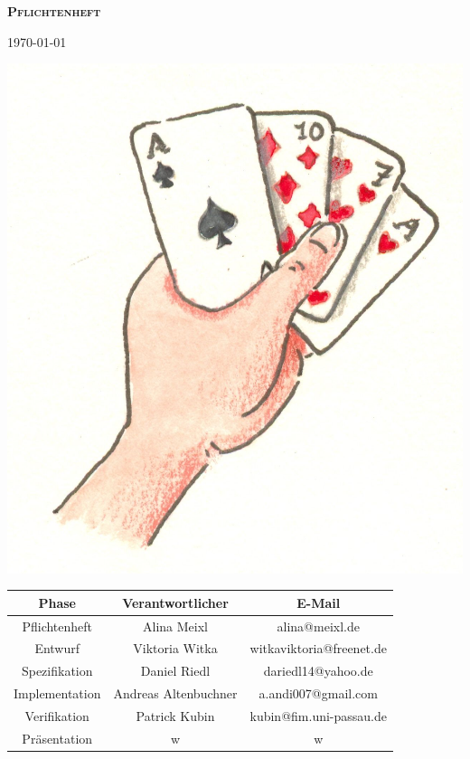 \documentclass{article}
\begin{document}
\begin{titlepage}

\begin{center}
\textbf{\textsc{\LARGE Pflichtenheft}}

{\large \today}

\vspace{2cm}
\includegraphics{kartenspiel}

\vspace{2cm}

\begin{tabular}{|c|c|c|}\hline
   Phase & Verantwortlicher & E-Mail \\ \hline\hline
   Pflichtenheft & Alina  Meixl  &  alina@meixl.de \\ \hline
   Entwurf & Viktoria Witka & witkaviktoria@freenet.de \\ \hline
   Spezifikation & Daniel Riedl & dariedl14@yahoo.de \\ \hline
   Implementation & Andreas Altenbuchner& a.andi007@gmail.com\\ \hline
   Verifikation &Patrick Kubin & kubin@fim.uni-passau.de\\ \hline
   Präsentation & w& w\\ \hline
 \end{tabular}

\end{center}

\end{titlepage}
\end{document}
